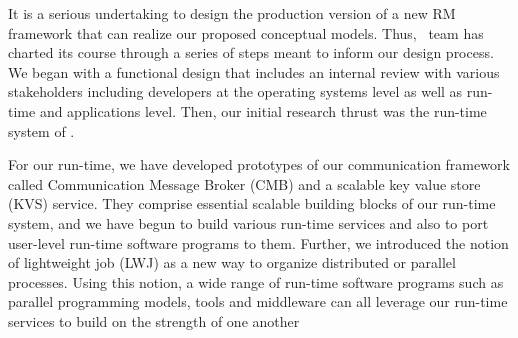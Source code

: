 It is a serious undertaking 
to design the production version of a new 
RM framework that can realize our proposed conceptual models.
Thus, \flux\ team has charted its course through a series of steps
meant to inform our design process. 
We began with a functional design that includes an
internal review with various stakeholders including 
developers at the operating systems level
as well as run-time and applications level.
Then, our initial research thrust was the run-time system of \flux.

%
For our run-time, we have developed prototypes of our communication framework 
called Communication Message Broker (CMB) 
and a scalable key value store (KVS) service.
They comprise essential scalable building blocks of our run-time system, 
and we have begun to build various run-time services and also 
to port user-level run-time software programs to them.
Further, we introduced the notion of lightweight 
job (LWJ) as a new way to organize distributed or parallel processes.
Using this notion, a wide range of run-time software
programs such as parallel programming models,
tools and middleware can all leverage our run-time services 
to build on the strength of one another 

\ifcomments
{}
\fi
